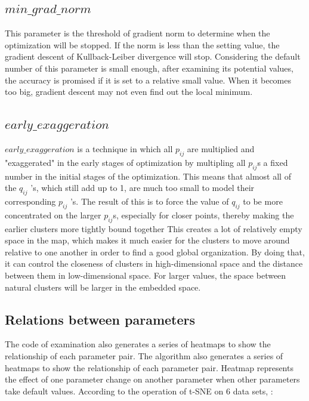 \subsection{$min\_grad\_norm$}

This parameter is the threshold of gradient norm to determine when the optimization will be stopped. If the norm is less than the setting value, the gradient descent of Kullback-Leiber divergence will stop. Considering the default number of this parameter is small enough, after examining its potential values, the accuracy is promised if it is set to a relative small value. When it becomes too big, gradient descent may not even find out the local minimum.

\subsection{$early\_exaggeration$}

$ early\_exaggeration $ is a technique in which all $p_{ij}$ are multiplied and "exaggerated" in the early stages of optimization by multipling all $p_{ij}$s a fixed number in the initial stages of the optimization. This means that almost all of the $q_{ij}$ ’s, which still add up to 1, are much too small to model their corresponding $p_{ij}$ ’s. The result of this is to force the value of $q_ {ij}$ to be more concentrated on the larger $ p_{ij} $s, especially for closer points, thereby making the earlier clusters more tightly bound together This creates a lot of relatively empty space in the map, which makes it much easier for the clusters to move around relative to one another in order to find a good global organization\cite{ref13}. By doing that, it can control the closeness of clusters in high-dimensional space and the distance between them in low-dimensional space. For larger values, the space between natural clusters will be larger in the embedded space.


\subsection{Relations between parameters}

The code of examination also generates a series of heatmaps to show the relationship of each parameter pair. The algorithm also generates a series of heatmaps to show the relationship of each parameter pair. Heatmap represents the effect of one parameter change on another parameter when other parameters take default values. According to the operation of t-SNE on 6 data sets, :

